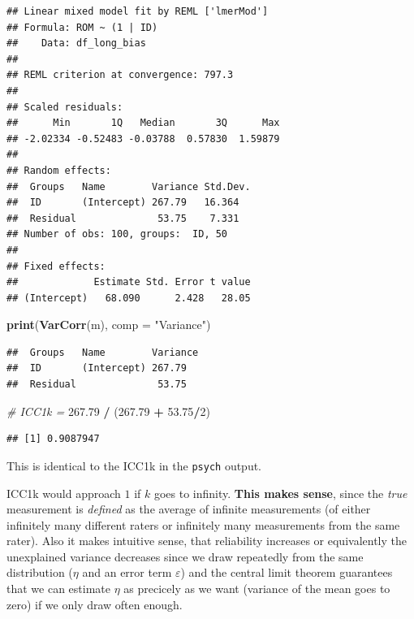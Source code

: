 \documentclass[
]{article}
\newenvironment{Shaded}{\begin{snugshade}}{\end{snugshade}}
\newcommand{\AttributeTok}[1]{\textcolor[rgb]{0.13,0.29,0.53}{#1}}
\newcommand{\CommentTok}[1]{\textcolor[rgb]{0.56,0.35,0.01}{\textit{#1}}}
\newcommand{\DecValTok}[1]{\textcolor[rgb]{0.00,0.00,0.81}{#1}}
\newcommand{\FloatTok}[1]{\textcolor[rgb]{0.00,0.00,0.81}{#1}}
\newcommand{\FunctionTok}[1]{\textcolor[rgb]{0.13,0.29,0.53}{\textbf{#1}}}
\newcommand{\NormalTok}[1]{#1}
\newcommand{\SpecialCharTok}[1]{\textcolor[rgb]{0.81,0.36,0.00}{\textbf{#1}}}
\newcommand{\StringTok}[1]{\textcolor[rgb]{0.31,0.60,0.02}{#1}}
\begin{document}
\begin{verbatim}
## Linear mixed model fit by REML ['lmerMod']
## Formula: ROM ~ (1 | ID)
##    Data: df_long_bias
## 
## REML criterion at convergence: 797.3
## 
## Scaled residuals: 
##      Min       1Q   Median       3Q      Max 
## -2.02334 -0.52483 -0.03788  0.57830  1.59879 
## 
## Random effects:
##  Groups   Name        Variance Std.Dev.
##  ID       (Intercept) 267.79   16.364  
##  Residual              53.75    7.331  
## Number of obs: 100, groups:  ID, 50
## 
## Fixed effects:
##             Estimate Std. Error t value
## (Intercept)   68.090      2.428   28.05
\end{verbatim}

\begin{Shaded}
\begin{Highlighting}[]
\FunctionTok{print}\NormalTok{(}\FunctionTok{VarCorr}\NormalTok{(m), }\AttributeTok{comp =} \StringTok{"Variance"}\NormalTok{)}
\end{Highlighting}
\end{Shaded}

\begin{verbatim}
##  Groups   Name        Variance
##  ID       (Intercept) 267.79  
##  Residual              53.75
\end{verbatim}

\begin{Shaded}
\begin{Highlighting}[]
\CommentTok{\# ICC1k = }
\FloatTok{267.79} \SpecialCharTok{/}\NormalTok{ (}\FloatTok{267.79} \SpecialCharTok{+} \FloatTok{53.75}\SpecialCharTok{/}\DecValTok{2}\NormalTok{)}
\end{Highlighting}
\end{Shaded}

\begin{verbatim}
## [1] 0.9087947
\end{verbatim}

This is identical to the ICC1k in the \texttt{psych} output.

ICC1k would approach \(1\) if \(k\) goes to infinity.
\textbf{This makes sense}, since the \emph{true} measurement is \emph{defined} as the average of
infinite measurements (of either infinitely many different raters or infinitely many
measurements from the same rater).
Also it makes intuitive sense, that
reliability increases or equivalently the unexplained variance decreases
since we draw repeatedly from the same distribution (\(\eta\) and an error term \(\varepsilon\))
and the central limit theorem guarantees that we can estimate \(\eta\) as precicely
as we want (variance of the mean goes to zero) if we only draw often enough.
\end{document}

